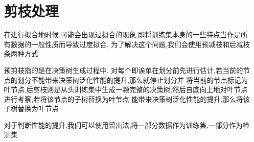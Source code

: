 \documentclass[UTF8]{ctexart}
\begin{document}
\section{剪枝处理}
在进行拟合地时候,可能会出现过拟合的现象,即将训练集本身的一些特点当作是所有数据的一般性质而导致过度拟合,
为了解决这个问题,我们会使用预减枝和后减枝条两种方式
\par 
预剪枝指的是在决策树生成过程中, 对每个即诶单在划分前先进行估计,若当前的节点的划分不能带来决策树泛化性能的提升,那么就停止划分并
将当前的节点标记为叶节点,后剪枝则是从头训练集中生成一颗完整的决策树,然后自底向上地对叶节点进行考察,若将该节点的子树替换为叶节点
能带来决策树泛化性能的提升,那么将该子树替换为叶节点
\par 
对于判断性能的提升,我们可以使用留出法,将一部分数据作为训练集,一部分作为检测集
\end{document}
